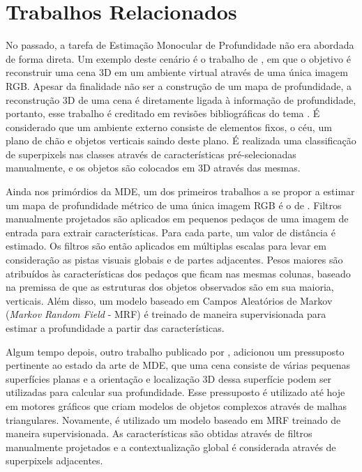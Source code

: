 \chapter{Trabalhos Relacionados}


No passado, a tarefa de Estimação Monocular de Profundidade não era abordada de forma direta. Um exemplo deste cenário é o trabalho de , em que o objetivo é reconstruir uma cena 3D em um ambiente virtual através de uma única imagem RGB. Apesar da finalidade não ser a construção de um mapa de profundidade, a reconstrução 3D de uma cena é diretamente ligada à informação de profundidade, portanto, esse trabalho é creditado em revisões bibliográficas do tema \cite{mertan2022single}. É considerado que um ambiente externo consiste de elementos fixos, o céu, um plano de chão e objetos verticais saindo deste plano. É realizada uma classificação de superpixels nas classes através de características pré-selecionadas manualmente, e os objetos são colocados em 3D através das mesmas.


Ainda nos primórdios da MDE, um dos primeiros trabalhos a se propor a estimar um mapa de profundidade métrico de uma única imagem RGB é o de . Filtros manualmente projetados são aplicados em pequenos pedaços de uma imagem de entrada para extrair características. Para cada parte, um valor de distância é estimado. Os filtros são então aplicados em múltiplas escalas para levar em consideração as pistas visuais globais e de partes adjacentes. Pesos maiores são atribuídos às características dos pedaços que ficam nas mesmas colunas, baseado na premissa de que as estruturas dos objetos observados são em sua maioria, verticais. Além disso, um modelo baseado em Campos Aleatórios de Markov (\textit{Markov Random Field} - MRF) é treinado de maneira supervisionada para estimar a profundidade a partir das características.


Algum tempo depois, outro trabalho publicado por , adicionou um pressuposto pertinente ao estado da arte de MDE, que uma cena consiste de várias pequenas superfícies planas e a orientação e localização 3D dessa superfície podem ser utilizadas para calcular sua profundidade. Esse pressuposto é utilizado até hoje em motores gráficos que criam modelos de objetos complexos através de malhas triangulares. Novamente, é utilizado um modelo baseado em MRF treinado de maneira supervisionada. As características são obtidas através de filtros manualmente projetados e a contextualização global é considerada através de superpixels adjacentes.


